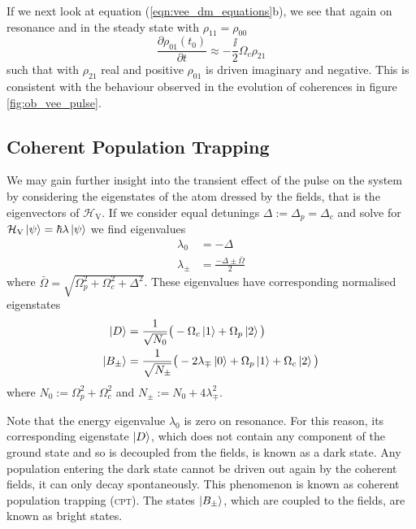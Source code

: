     If we next look at equation (\ref{eqn:vee_dm_equations}b), we see that again
    on resonance and in the steady state with $\rho_{11} = \rho_{00}$
    \begin{equation}
       \frac{\partial \rho_{01}(t_{0})}{\partial t} \approx -\frac{\ii}{2} 
        \Omega_c \rho_{21}
      \label{eqn:rho01}
    \end{equation}
    such that with $\rho_{21}$ real and positive $\rho_{01}$ is driven imaginary
    and negative. This is consistent with the behaviour observed in the
    evolution of coherences in figure \ref{fig:ob_vee_pulse}.

  \subsection{Coherent Population Trapping}

    We may gain further insight into the transient effect of the pulse on the
    system by considering the eigenstates of the atom dressed by the fields,
    that is the eigenvectors of $\mathcal{H}_\mathrm{V}$.\cite{lambropoulos2007fundamentals, Blok1990} If we consider equal
    detunings $\Delta := \Delta_p = \Delta_c$ and solve for
    $\mathcal{H}_\mathrm{V} \Ket{\psi} = \hbar \lambda \Ket{\psi}$ we find
    eigenvalues
    \begin{subequations}
      \begin{align}
      \lambda_0 &= -\Delta \\
      \lambda_\pm &= \frac{-\Delta \pm \bar{\Omega}}{2}
      \end{align}
      \label{eqn:vee_eigvals}
    \end{subequations}
    where $\bar{\Omega}= \sqrt{\Omega_p^2 + \Omega_c^2 + \Delta^2}$. These
    eigenvalues have corresponding normalised eigenstates
    \begin{subequations}
      \begin{align}
      \Ket{D} &= \frac{1}{\sqrt{N_0}} \big( -\Omega_c \Ket{1} + \Omega_p 
      \Ket{2} \big) \\
      \Ket{B_\pm} &= \frac{1}{\sqrt{N_\pm}} \big(-2 \lambda_\mp \Ket{0} + 
      \Omega_p \Ket{1} + \Omega_c \Ket{2} \big)
      \end{align}
      \label{eqn:vee_eigvects}
    \end{subequations}
    where $N_0 := \Omega_p^2 + \Omega_c^2$ and $N_\pm := N_0 + 4 \lambda_\mp^2$.

    Note that the energy eigenvalue $\lambda_0$ is zero on resonance. For this
    reason, its corresponding eigenstate $\Ket{D}$, which does not contain any
    component of the ground state and so is decoupled from the fields, is known
    as a dark state. Any population entering the dark state cannot be driven out
    again by the coherent fields, it can only decay spontaneously. This
    phenomenon is known as coherent population trapping
    (\textsc{cpt}).\cite{Fleischhauer2005} The states $\Ket{B_\pm}$, which are
    coupled to the fields, are known as bright states.

